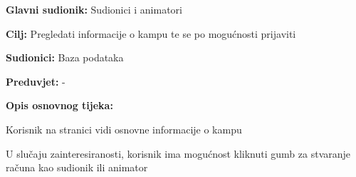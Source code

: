 \noindent {}
\begin{packed_item}

	\item \textbf{Glavni sudionik: }Sudionici i animatori
	\item  \textbf{Cilj:} Pregledati informacije o kampu te se po mogućnosti prijaviti
	\item  \textbf{Sudionici:} Baza podataka
	\item  \textbf{Preduvjet:} -
	\item  \textbf{Opis osnovnog tijeka:}

	\item[] \begin{packed_enum}

				\item Korisnik na stranici vidi osnovne informacije o kampu
				\item U slučaju zainteresiranosti, korisnik ima mogućnost kliknuti gumb za stvaranje računa kao sudionik ili animator

	\end{packed_enum}

\end{packed_item}
\vspace{5mm} %

